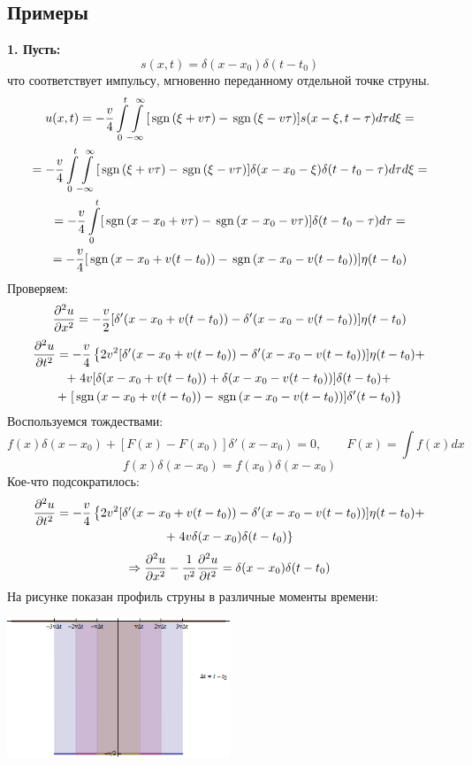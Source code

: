 \subsection{Примеры}

\textbf{1. Пусть:}
\[
s(x, t) = \delta(x - x_0) \delta (t - t_0) 
\]
что соответствует импульсу, мгновенно переданному отдельной точке струны.
\[
\begin{gathered}
u(x, t) =
-\frac{v}{4} \int\limits_{0}^{t} \! \int\limits_{-\infty}^{\infty} [ \mathrm{\,sgn}\, (\xi + v \tau) - \mathrm{\,sgn}\, (\xi - v\tau) ] s(x - \xi, t - \tau) d\tau d\xi =
\\ =
-\frac{v}{4} \int\limits_{0}^{t} \! \int\limits_{-\infty}^{\infty} [ \mathrm{\,sgn}\, (\xi + v \tau) - \mathrm{\,sgn}\, (\xi - v\tau) ] \delta(x - x_0 - \xi) \delta (t - t_0 - \tau)  d\tau d\xi =
\\ =
-\frac{v}{4} \int\limits_{0}^{t}  [ \mathrm{\,sgn}\, (x - x_0 + v \tau) - \mathrm{\,sgn}\, (x - x_0 - v\tau) ] \delta (t - t_0 - \tau)  d\tau = 
\\ =
-\frac{v}{4} [ \mathrm{\,sgn}\, (x - x_0 + v (t - t_0)) - \mathrm{\,sgn}\, (x - x_0 - v(t - t_0)) ] \eta(t - t_0)
\end{gathered}
\]
Проверяем:
\[
\frac{\partial^2 u}{\partial x^2} = - \frac{v}{2} [\delta' (x - x_0 + v (t - t_0)) - \delta' (x - x_0 - v(t - t_0))]\eta(t - t_0)
\]
\[
\begin{gathered}
\frac{\partial^2 u}{\partial t^2} = -\frac{v}{4} \left\{
2 v^2 [\delta' (x - x_0 + v (t - t_0)) - \delta' (x - x_0 - v(t - t_0)) ] \eta(t - t_0) +
\right.\\ + \left.
4 v [\delta (x - x_0 + v (t - t_0)) + \delta (x - x_0 - v(t - t_0))]\delta(t - t_0) +
\right.\\ + \left.
[ \mathrm{\,sgn}\, (x - x_0 + v (t - t_0)) - \mathrm{\,sgn}\, (x - x_0 - v(t - t_0)) ] \delta'(t - t_0)
\right\}
\end{gathered}
\]
Воспользуемся тождествами:
\[
f(x)\delta(x - x_0) + [F(x) - F(x_0)] \delta'(x - x_0) = 0, \qquad F(x) = \int f(x) dx
\]
\[
f(x) \delta(x -x_0) = f(x_0) \delta(x - x_0)
\]
Кое-что подсократилось:
\[
\begin{gathered}
\frac{\partial^2 u}{\partial t^2} = -\frac{v}{4} \left\{
2 v^2 [\delta' (x - x_0 + v (t - t_0)) - \delta' (x - x_0 - v(t - t_0)) ] \eta(t - t_0) +
\right.\\ + \left.
4 v \delta (x - x_0) \delta(t - t_0)
\right\}
\end{gathered}
\]
\[
\Rightarrow
\frac{\partial^2 u}{\partial x^2} - \frac{1}{v^2} \frac{\partial^2 u}{\partial t^2} = \delta (x - x_0) \delta(t - t_0)
\]
На рисунке показан профиль струны в различные моменты времени:
\begin{center}
	\includegraphics[width=0.5\textwidth]{images/png/for_delta_force.png}
\end{center}

